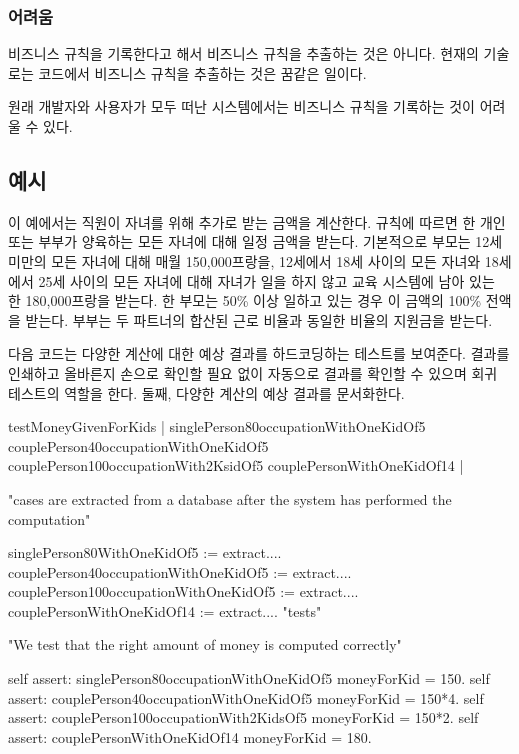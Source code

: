 \documentclass[a4paper,10pt,twoside]{book}
\begin{document}
\subsubsection*{어려움}

\begin{bulletlist}
\item 비즈니스 규칙을 기록한다고 해서 비즈니스 규칙을 추출하는 것은 아니다. 현재의 기술로는 코드에서 비즈니스 규칙을 추출하는 것은 꿈같은 일이다.
\item 원래 개발자와 사용자가 모두 떠난 시스템에서는 비즈니스 규칙을 기록하는 것이 어려울 수 있다. 
\end{bulletlist}

\subsection*{예시}

이 예에서는 직원이 자녀를 위해 추가로 받는 금액을 계산한다. 규칙에 따르면 한 개인 또는 부부가 양육하는 모든 자녀에 대해 일정 금액을 받는다. 기본적으로 부모는 12세 미만의 모든 자녀에 대해 매월 150,000프랑을, 12세에서 18세 사이의 모든 자녀와 18세에서 25세 사이의 모든 자녀에 대해 자녀가 일을 하지 않고 교육 시스템에 남아 있는 한 180,000프랑을 받는다. 한 부모는 50\% 이상 일하고 있는 경우 이 금액의 100\% 전액을 받는다. 부부는 두 파트너의 합산된 근로 비율과 동일한 비율의 지원금을 받는다.

다음  코드는 다양한 계산에 대한 예상 결과를 하드코딩하는 테스트를 보여준다. 결과를 인쇄하고 올바른지 손으로 확인할 필요 없이 자동으로 결과를 확인할 수 있으며 회귀 테스트의 역할을 한다. 둘째, 다양한 계산의 예상 결과를 문서화한다.

\begin{code}
testMoneyGivenForKids
	|	singlePerson80occupationWithOneKidOf5
		couplePerson40occupationWithOneKidOf5
		couplePerson100occupationWith2KsidOf5
		couplePersonWithOneKidOf14 |

"cases are extracted from a database after the system has
performed the computation"

singlePerson80WithOneKidOf5 := extract....
couplePerson40occupationWithOneKidOf5 := extract....
couplePerson100occupationWithOneKidOf5 := extract....
couplePersonWithOneKidOf14 := extract....
"tests"

"We test that the right amount of money is computed correctly"

self assert: singlePerson80occupationWithOneKidOf5 moneyForKid = 150.
self assert: couplePerson40occupationWithOneKidOf5 moneyForKid = 150*4.
self assert: couplePerson100occupationWith2KidsOf5 moneyForKid = 150*2.
self assert: couplePersonWithOneKidOf14 moneyForKid = 180.
\end{code}
\end{document}
